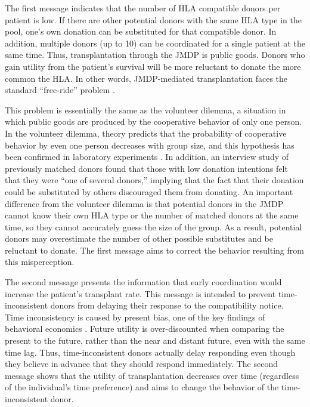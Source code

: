 \documentclass[
]{article}
\begin{document}
The first message indicates that the number of HLA compatible donors per patient is low. If there are other potential donors with the same HLA type in the pool, one's own donation can be substituted for that compatible donor. In addition, multiple donors (up to 10) can be coordinated for a single patient at the same time. Thus, transplantation through the JMDP is public goods. Donors who gain utility from the patient's survival will be more reluctant to donate the more common the HLA. In other words, JMDP-mediated transplantation faces the standard ``free-ride'' problem \citep{Bergstrom2009}.

This problem is essentially the same as the volunteer dilemma, a situation in which public goods are produced by the cooperative behavior of only one person. In the volunteer dilemma, theory predicts that the probability of cooperative behavior by even one person decreases with group size, and this hypothesis has been confirmed in laboratory experiments \citep{Diekmann1985, Diekmann1986, Franzen1999, Davis2017}. In addition, an interview study of previously matched donors \citep{Kurosawa2022} found that those with low donation intentions felt that they were ``one of several donors,'' implying that the fact that their donation could be substituted by others discouraged them from donating. An important difference from the volunteer dilemma is that potential donors in the JMDP cannot know their own HLA type or the number of matched donors at the same time, so they cannot accurately guess the size of the group. As a result, potential donors may overestimate the number of other possible substitutes and be reluctant to donate. The first message aims to correct the behavior resulting from this misperception.

The second message presents the information that early coordination would increase the patient's transplant rate. This message is intended to prevent time-inconsistent donors from delaying their response to the compatibility notice. Time inconsistency is caused by present bias, one of the key findings of behavioral economics \citep{Laibson1997, ODonoghue2001}. Future utility is over-discounted when comparing the present to the future, rather than the near and distant future, even with the same time lag. Thus, time-inconsistent donors actually delay responding even though they believe in advance that they should respond immediately. The second message shows that the utility of transplantation decreases over time (regardless of the individual's time preference) and aims to change the behavior of the time-inconsistent donor.
\end{document}
